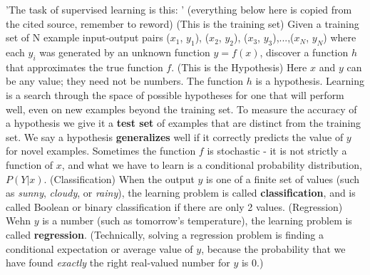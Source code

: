 'The task of supervised learning is this: ' \cite{russell2016artificial} (everything below here is copied from the cited source, remember to reword)
(This is the training set)
Given a training set of N example input-output pairs
($x_1$, $y_1$), ($x_2$, $y_2$), ($x_3$, $y_3$),...,($x_N$, $y_N$)
where each $y_i$ was generated by an unknown function $y=f(x)$, discover a function $h$ that approximates the true function $f$.
(This is the Hypothesis)
Here $x$ and $y$ can be any value; they need not be numbers. The function $h$ is a hypothesis. Learning is a search through the space of possible hypotheses for one that will perform well, even on new examples beyond the training set. To measure the accuracy of a hypothesis we give it a \textbf{test set} of examples that are distinct from the training set. We say a hypothesis \textbf{generalizes} well if it correctly predicts the value of $y$ for novel examples. Sometimes the function $f$ is stochastic - it is not strictly a function of $x$, and what we have to learn is a conditional probability distribution, $P(Y|x)$.
(Classification)
When the output $y$ is one of a finite set of values (such as \textit{sunny}, \textit{cloudy}, or \textit{rainy}), the learning problem is called \textbf{classification}, and is called Boolean or binary classification if there are only 2 values.
(Regression)
Wehn $y$ is a number (such as tomorrow's temperature), the learning problem is called \textbf{regression}. (Technically, solving a regression problem is finding a conditional expectation or average value of $y$, because the probability that we have found \textit{exactly} the right real-valued number for $y$ is 0.)




